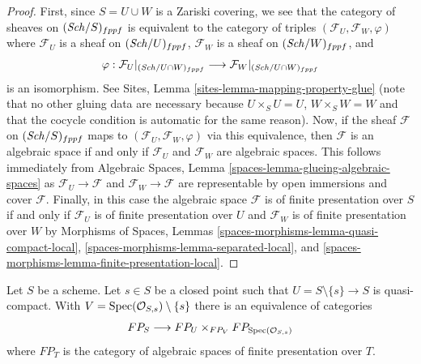 \begin{proof}
First, since $S = U \cup W$ is a Zariski covering, we see that the
category of sheaves on $(\mathit{Sch}/S)_{fppf}$ is equivalent to the category
of triples $(\mathcal{F}_U, \mathcal{F}_W, \varphi)$ where
$\mathcal{F}_U$ is a sheaf on $(\mathit{Sch}/U)_{fppf}$,
$\mathcal{F}_W$ is a sheaf on $(\mathit{Sch}/W)_{fppf}$, and
$$
\varphi :
\mathcal{F}_U|_{(\mathit{Sch}/U \cap W)_{fppf}}
\longrightarrow
\mathcal{F}_W|_{(\mathit{Sch}/U \cap W)_{fppf}}
$$
is an isomorphism. See Sites, Lemma \ref{sites-lemma-mapping-property-glue}
(note that no other gluing data are necessary because
$U \times_S U = U$, $W \times_S W = W$ and that the cocycle
condition is automatic for the same reason).
Now, if the sheaf $\mathcal{F}$ on $(\mathit{Sch}/S)_{fppf}$
maps to $(\mathcal{F}_U, \mathcal{F}_W, \varphi)$
via this equivalence, then $\mathcal{F}$ is an algebraic space
if and only if $\mathcal{F}_U$ and $\mathcal{F}_W$ are algebraic spaces.
This follows immediately from
Algebraic Spaces, Lemma \ref{spaces-lemma-glueing-algebraic-spaces}
as $\mathcal{F}_U \to \mathcal{F}$ and $\mathcal{F}_W \to \mathcal{F}$
are representable by open immersions and cover $\mathcal{F}$.
Finally, in this case the algebraic space $\mathcal{F}$ is of finite
presentation over $S$ if and only if $\mathcal{F}_U$ is of finite presentation
over $U$ and $\mathcal{F}_W$ is of finite presentation over $W$
by Morphisms of Spaces, Lemmas
\ref{spaces-morphisms-lemma-quasi-compact-local},
\ref{spaces-morphisms-lemma-separated-local}, and
\ref{spaces-morphisms-lemma-finite-presentation-local}.
\end{proof}

\begin{lemma}
\label{lemma-glueing-near-closed-point}
Let $S$ be a scheme. Let $s \in S$ be a closed point such that
$U = S \setminus \{s\} \to S$ is quasi-compact. With
$V = \mathop{\mathrm{Spec}}(\mathcal{O}_{S, s}) \setminus \{s\}$ there is
an equivalence of categories
$$
FP_S \longrightarrow FP_U \times_{FP_V} FP_{\mathop{\mathrm{Spec}}(\mathcal{O}_{S, s})}
$$
where $FP_T$ is the category of algebraic spaces of finite presentation
over $T$.
\end{lemma}

